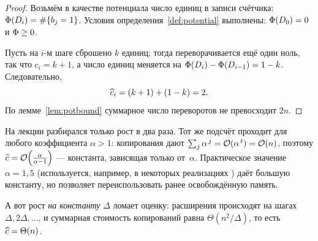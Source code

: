 \documentclass[../main.tex]{subfiles}
\begin{document}
\begin{proof}
  Возьмём в качестве потенциала число единиц в записи счётчика:
  $\Phi(D_i) = \#\{b_j = 1\}$. Условия определения~\ref{def:potential} выполнены:
  $\Phi(D_0) = 0$ и $\Phi \ge 0$.

  Пусть на $i$-м шаге сброшено $k$ единиц; тогда переворачивается ещё один ноль,
  так что $c_i = k + 1$, а число единиц меняется на $\Phi(D_i) - \Phi(D_{i-1}) = 1 - k$.
  Следовательно,
  \[
    \widehat{c}_i = (k+1) + (1-k) = 2 .
  \]
  По лемме~\ref{lem:potbound} суммарное число переворотов не превосходит $2n$.
\end{proof}

\begin{Addition}
  На лекции разбирался только рост в два раза. Тот же подсчёт проходит для любого
  коэффициента $\alpha > 1$: копирования дают
  $\sum_j \alpha^{\,j} = \mathcal{O}(\alpha^{\,t}) = \mathcal{O}(n)$, поэтому
  $\widehat{c} = \mathcal{O}\!\left(\frac{\alpha}{\alpha - 1}\right)$ --- константа, зависящая
  только от~$\alpha$. Практическое значение $\alpha = 1{,}5$ (используется, например,
  в некоторых реализациях ) даёт большую константу, но позволяет
  переиспользовать ранее освобождённую память.

  А вот рост \emph{на константу} $\Delta$ ломает оценку: расширения происходят на
  шагах $\Delta, 2\Delta, \dots$, и суммарная стоимость копирований равна
  $\Theta(n^2/\Delta)$, то есть $\widehat{c} = \Theta(n)$.
\end{Addition}
\end{document}
